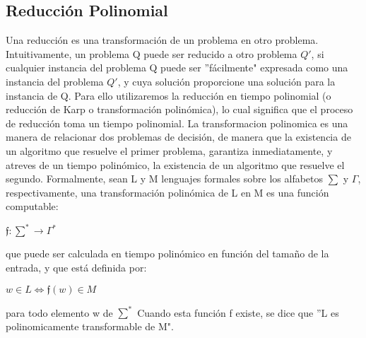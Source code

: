 \documentclass[12pt]{report}
\begin{document}
\subsection{Reducción Polinomial}
Una reducción es una transformación de un problema en otro problema. Intuitivamente, un problema Q puede ser reducido a otro problema $Q'$, si cualquier instancia del problema Q puede ser ''fácilmente" expresada como una instancia del problema $Q'$, y cuya solución proporcione una solución para la instancia de Q.
Para ello utilizaremos la reducción en tiempo polinomial (o reducción de Karp o transformación polinómica), lo cual significa que el proceso de reducción toma un tiempo polinomial. La transformacion polinomica es una manera de relacionar dos problemas de decisión, de manera que la existencia de un algoritmo que resuelve el primer problema, garantiza inmediatamente, y atreves de un tiempo polinómico, la existencia de un algoritmo que resuelve el segundo.
Formalmente, sean L y M lenguajes formales sobre los alfabetos $\sum$ y $\Gamma$, respectivamente, una transformación polinómica de L en M es una función computable:
\begin{center}
$\mathfrak{f}:\sum^*\rightarrow\Gamma^*$
\end{center}
que puede ser calculada en tiempo polinómico en función del tamaño de la entrada, y que está definida por:
\begin{center}
$w \in L \Leftrightarrow \mathfrak{f}(w) \in M$
\end{center}
para todo elemento w de $\sum^*$
Cuando esta función f existe, se dice que ''L es polinomicamente transformable de M".
\end{document}

